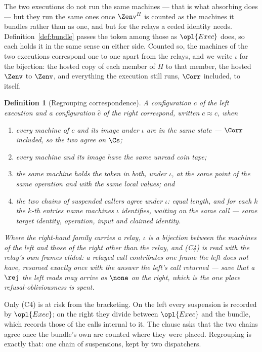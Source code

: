 \documentclass[10pt,oneside,openany]{book}
\theoremstyle{accentdef}
\newtheorem{definition}{Definition}[chapter]
\theoremstyle{accentplain}
\begin{document}
The two executions do not run the same machines --- that is what absorbing does --- but they run
the same ones once $\Zenv^{H}$ is counted as the machines it bundles rather than as one, and but for
the relays a ceded identity needs. Definition~\ref{def:bundle} passes the token among those as
$\opl{Exec}$ does, so each holds it in the same sense on either side. Counted so, the machines of the
two executions correspond one to one apart from the relays, and we write $\iota$ for the bijection:
the hosted copy of each member of $H$ to that member, the hosted $\Zenv$ to $\Zenv$, and everything
the execution still runs, $\Corr$ included, to itself.

\begin{definition}[Regrouping correspondence]\label{def:regcorr}
A configuration $c$ of the left execution and a configuration $\hat c$ of the right
\emph{correspond}, written $c \approx \hat c$, when
\begin{enumerate}[label=(C\arabic*),leftmargin=3em]
  \item every machine of $c$ and its image under $\iota$ are in the same state --- $\Corr$
        included, so the two agree on $\Cs$;
  \item every machine and its image have the same unread coin tape;
  \item the same machine holds the token in both, under $\iota$, at the same point of the same
        operation and with the same local values; and
  \item the two chains of suspended callers agree under $\iota$: equal length, and for each $k$ the
        $k$-th entries name machines $\iota$ identifies, waiting on the same call --- same target
        identity, operation, input and claimed identity.
\end{enumerate}
Where the right-hand family carries a relay, $\iota$ is a bijection between the machines of the left
and those of the right \emph{other than} the relay, and (C4) is read with the relay's own frames
elided: a relayed call contributes one frame the left does not have, resumed exactly once with the
answer the left's call returned --- save that a $\rej$ the left reads may arrive as $\none$ on the
right, which is the one place refusal-obliviousness is spent.
\end{definition}

Only (C4) is at risk from the bracketing. On the left every suspension is recorded by
$\opl{Exec}$; on the right they divide between $\opl{Exec}$ and the bundle, which records those of
the calls internal to it. The clause asks that the two chains agree once the bundle's own are
counted where they were placed. Regrouping is exactly that: one chain of suspensions, kept by two
dispatchers.
\end{document}
